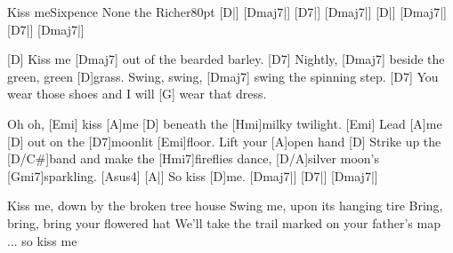 \begin{song}{Kiss me}{Sixpence None the Richer}{80pt}
\verse{*}%
[D|]{} [Dmaj7|]{} [D7|]{} [Dmaj7|]{}
[D|]{} [Dmaj7|]{} [D7|]{} [Dmaj7|]{}

%
[D]{} Kiss me [Dmaj7]{} out of the bearded barley.
[D7]{} Nightly, [Dmaj7]{} beside the green, green [D]grass.
Swing, swing, [Dmaj7]{} swing the spinning step.
[D7]{} You wear those shoes and I will [G]{} wear that dress.

\chorus%
Oh oh, [Emi]{} kiss [A]me [D]{} beneath the [Hmi]milky twilight.
[Emi]{} Lead  [A]me [D]{} out on the [D7]moonlit [Emi]{floor}.
Lift your [A]open hand
[D]{} Strike up the [D/C#]band and make the [Hmi7]fireflies dance,
[D/A]silver moon's [Gmi7]sparkling. [Asus4]{}
[A|]{} So kiss [D]me. [Dmaj7|]{} [D7|]{} [Dmaj7|]{}

%
Kiss me, down by the broken tree house
Swing me, upon its hanging tire
Bring, bring,  bring your flowered hat
We'll take the trail marked on your father's map
\repchor\ 
... \rl so kiss me

\end{song}
